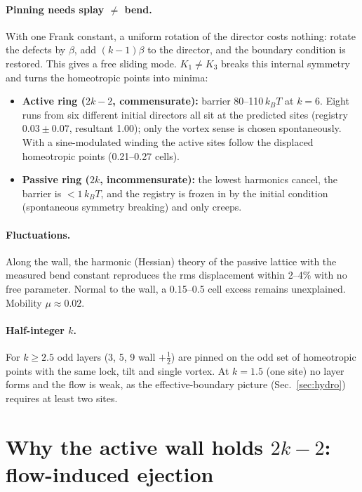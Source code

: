 \documentclass[11pt,a4paper]{article}
\newcommand{\half}{\tfrac12}
\newcommand{\kT}{k_BT}
\begin{document}
\paragraph{Pinning needs splay $\neq$ bend.} With one Frank constant, a uniform rotation of the director costs nothing: rotate the defects by $\beta$, add
$(k-1)\beta$ to the director, and the boundary condition is restored. This gives a free sliding mode. $K_1\neq K_3$ breaks this internal symmetry and turns the
homeotropic points into minima:
\begin{itemize}
  \item \textbf{Active ring ($2k-2$, commensurate):} barrier 80--110\,$\kT$ at $k=6$. Eight runs from six different initial directors all sit at the predicted
        sites (registry $0.03\pm0.07$, resultant 1.00); only the vortex sense is chosen spontaneously. With a sine-modulated winding the active sites follow the
        displaced homeotropic points (0.21--0.27 cells).
  \item \textbf{Passive ring ($2k$, incommensurate):} the lowest harmonics cancel, the barrier is $<1\,\kT$, and the registry is frozen in by the initial condition
        (spontaneous symmetry breaking) and only creeps.
\end{itemize}

\paragraph{Fluctuations.} Along the wall, the harmonic (Hessian) theory of the passive lattice with the measured bend constant reproduces the rms displacement within 2--4\%
with no free parameter. Normal to the wall, a 0.15--0.5 cell excess remains unexplained. Mobility $\mu\approx0.02$.

\paragraph{Half-integer $k$.} For $k\ge2.5$ odd layers (3, 5, 9 wall $+\half$) are pinned on the odd set of homeotropic points with the same lock, tilt and single
vortex. At $k=1.5$ (one site) no layer forms and the flow is weak, as the effective-boundary picture (Sec.~\ref{sec:hydro}) requires at least two sites.

\section{Why the active wall holds $2k-2$: flow-induced ejection}\label{sec:ejection}
\end{document}
